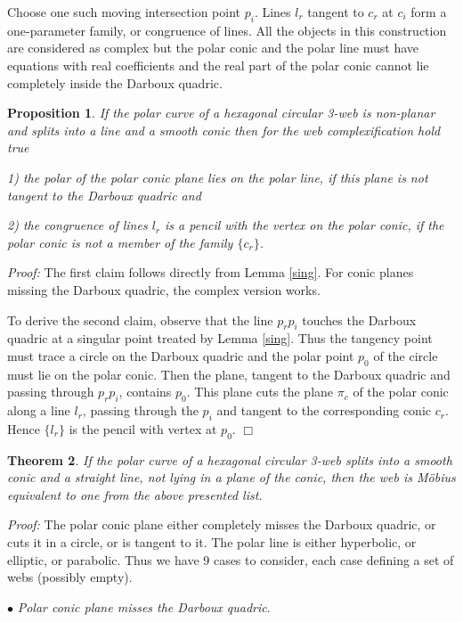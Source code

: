 \documentclass[11pt,a4paper]{article}
\newtheorem{theorem}{Theorem}
\newtheorem{proposition}[theorem]{Proposition}
\begin{document}
Choose one such moving intersection point $p_i$. Lines $l_r$ tangent to $c_r$ at $c_i$ form a one-parameter family, or congruence of lines. All the objects in this construction are considered as complex but the polar conic and the polar line  must have equations with real coefficients and the real part of the polar conic cannot lie completely inside the Darboux quadric.
    
\begin{proposition}\label{geometryconic} 
If the polar curve of a hexagonal circular 3-web is non-planar and splits into a line and a smooth conic then for the web complexification hold true  

1) the polar of the polar conic plane lies on the polar line, if this plane is not tangent to the Darboux quadric and  

 2) the congruence of lines $l_r$ is a pencil with the vertex on the polar conic, if the polar conic is not a member of the family $\{c_r\}$.

\end{proposition}   
{\it Proof:} The first claim follows directly from Lemma \ref{sing}. For conic planes missing the Darboux quadric, the complex version works.
 
To derive  the second claim, observe that the line $p_rp_i$ touches the Darboux quadric at a singular point treated by Lemma \ref{sing}. Thus the tangency point must trace a circle on the Darboux quadric and the polar point $p_0$ of the circle must lie on the polar conic. Then the plane, tangent to the Darboux quadric and passing through $p_rp_i$, contains $p_0$. This plane cuts the plane $\pi_c$ of the polar conic along a line $l_r$,  passing through the $p_i$ and tangent to the corresponding conic $c_r$. Hence $\{l_r\}$ is the pencil with vertex at $p_0$.  
\hfill $\Box$\\
\begin{theorem}\label{conicPencil}
If the polar curve of a hexagonal circular 3-web splits into a smooth conic and a straight line, not lying in a plane of the conic, then the web is Möbius equivalent to one from the above presented list. 
\end{theorem}
{\it Proof:} The polar conic plane  either completely misses the Darboux quadric, or cuts it in a circle, or is tangent to it. The  polar line is either  hyperbolic, or  elliptic, or  parabolic. Thus we have 9 cases to consider, each case defining a set of webs (possibly empty). 

\smallskip  
 $\bullet${ \it Polar conic plane misses the Darboux quadric}.
 
\end{document}
